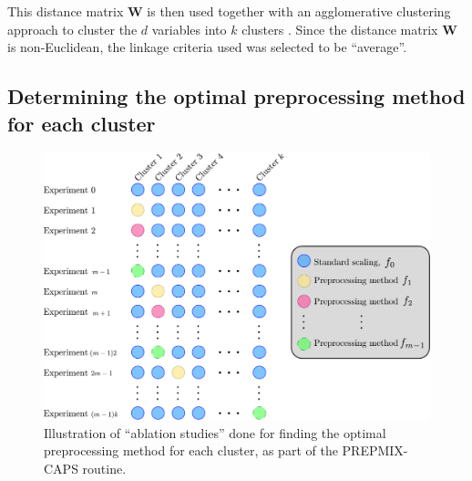\documentclass{statsmsc}
\begin{document}
This distance matrix $\mathbf{W}$ is then used together with an agglomerative clustering approach
to cluster the $d$ variables into $k$ clusters
\citep{hierarchical_clustering}. Since the distance matrix $\mathbf{W}$ is
non-Euclidean, the linkage criteria used was selected to be ``average''.


\subsection{Determining the optimal preprocessing method for each cluster}%
\label{sub:Determining the optimal preprocessing method for each clusterch cluster}

\begin{figure}
    \begin{center}
        \includegraphics[width=\textwidth]{diagrams/prepmix-diagram.pdf}
    \end{center}
    \caption{Illustration of ``ablation studies'' done for finding the optimal preprocessing method
    for each cluster, as part of the \ac{PREPMIX-CAPS} routine.}
    \label{fig:prepmix}
\end{figure}
\end{document}
